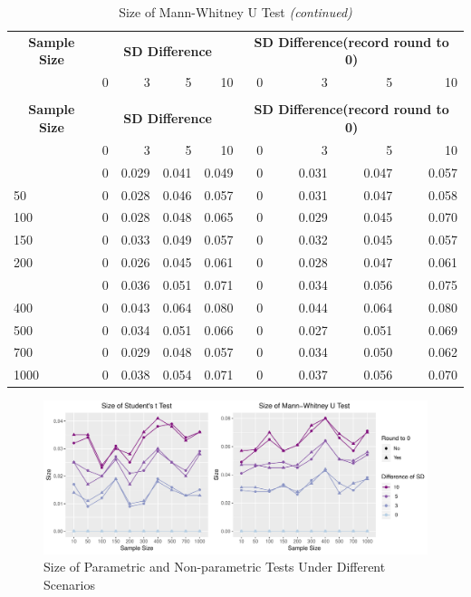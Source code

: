\documentclass[]{article}
\begin{document}
\begin{longtable}[t]{lrrrrrrrr}
\caption{\label{tab:size-tables}Size of Mann-Whitney U Test}\\
\toprule
\multicolumn{1}{c}{\bfseries Sample Size} & \multicolumn{4}{c}{\bfseries SD Difference} & \multicolumn{4}{c}{\bfseries SD Difference(record round to 0)} \\
\cmidrule(l{2pt}r{2pt}){1-1} \cmidrule(l{2pt}r{2pt}){2-5} \cmidrule(l{2pt}r{2pt}){6-9}
  & 0 & 3 & 5 & 10 & 0 & 3 & 5 & 10\\
\midrule
\endfirsthead
\caption[]{Size of Mann-Whitney U Test \textit{(continued)}}\\
\toprule
\multicolumn{1}{c}{\bfseries Sample Size} & \multicolumn{4}{c}{\bfseries SD Difference} & \multicolumn{4}{c}{\bfseries SD Difference(record round to 0)} \\
\cmidrule(l{2pt}r{2pt}){1-1} \cmidrule(l{2pt}r{2pt}){2-5} \cmidrule(l{2pt}r{2pt}){6-9}
  & 0 & 3 & 5 & 10 & 0 & 3 & 5 & 10\\
\midrule
\endhead
\
\endfoot
\bottomrule
\endlastfoot
10 & 0 & 0.029 & 0.041 & 0.049 & 0 & 0.031 & 0.047 & 0.057\\
50 & 0 & 0.028 & 0.046 & 0.057 & 0 & 0.031 & 0.047 & 0.058\\
100 & 0 & 0.028 & 0.048 & 0.065 & 0 & 0.029 & 0.045 & 0.070\\
150 & 0 & 0.033 & 0.049 & 0.057 & 0 & 0.032 & 0.045 & 0.057\\
200 & 0 & 0.026 & 0.045 & 0.061 & 0 & 0.028 & 0.047 & 0.061\\
\addlinespace
300 & 0 & 0.036 & 0.051 & 0.071 & 0 & 0.034 & 0.056 & 0.075\\
400 & 0 & 0.043 & 0.064 & 0.080 & 0 & 0.044 & 0.064 & 0.080\\
500 & 0 & 0.034 & 0.051 & 0.066 & 0 & 0.027 & 0.051 & 0.069\\
700 & 0 & 0.029 & 0.048 & 0.057 & 0 & 0.034 & 0.050 & 0.062\\
1000 & 0 & 0.038 & 0.054 & 0.071 & 0 & 0.037 & 0.056 & 0.070\\*
\end{longtable}

\begin{figure}
\centering
\includegraphics{../figure/size.pdf}
\caption{Size of Parametric and Non-parametric Tests Under Different
Scenarios}
\end{figure}
\end{document}
